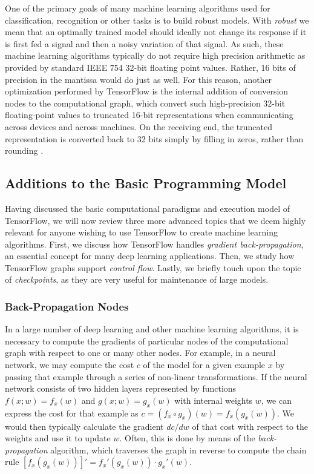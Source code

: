 One of the primary goals of many machine learning algorithms used for
classification, recognition or other tasks is to build robust models. With
\emph{robust} we mean that an optimally trained model should ideally not change
its response if it is first fed a signal and then a noisy variation of that
signal. As such, these machine learning algorithms typically do not require high
precision arithmetic as provided by standard IEEE 754 32-bit floating point
values. Rather, 16 bits of precision in the mantissa would do just as well. For
this reason, another optimization performed by TensorFlow is the internal
addition of conversion nodes to the computational graph, which convert such
high-precision 32-bit floating-point values to truncated 16-bit representations
when communicating across devices and across machines. On the receiving end, the
truncated representation is converted back to 32 bits simply by filling in
zeros, rather than rounding \cite{tensorflow}.

\subsection{Additions to the Basic Programming Model}\label{sec:model-ext}

Having discussed the basic computational paradigms and execution model of
TensorFlow, we will now review three more advanced topics that we deem highly
relevant for anyone wishing to use TensorFlow to create machine learning
algorithms. First, we discuss how TensorFlow handles \emph{gradient
  back-propagation}, an essential concept for many deep learning
applications. Then, we study how TensorFlow graphs support \emph{control
  flow}. Lastly, we briefly touch upon the topic of \emph{checkpoints}, as they
are very useful for maintenance of large models.

\subsubsection{Back-Propagation Nodes}\label{sec:model-ext-backprop}

In a large number of deep learning and other machine learning algorithms, it is
necessary to compute the gradients of particular nodes of the computational
graph with respect to one or many other nodes. For example, in a neural network,
we may compute the cost $c$ of the model for a given example $x$ by passing that
example through a series of non-linear transformations. If the neural network
consists of two hidden layers represented by functions $f(x;w) = f_x(w)$ and
$g(x;w) = g_x(w)$ with internal weights $w$, we can express the cost for that
example as $c = (f_x \circ g_x)(w) = f_x(g_x(w))$. We would then typically
calculate the gradient $dc/dw$ of that cost with respect to the weights and use
it to update $w$. Often, this is done by means of the \emph{back-propagation}
algorithm, which traverses the graph in reverse to compute the chain rule
$[f_x(g_x(w))]' = f_x'(g_x(w)) \cdot g_x'(w)$.


